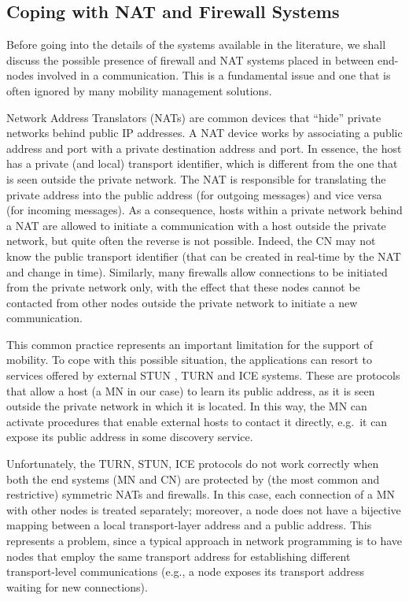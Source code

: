 \documentclass[preprint,12pt]{elsarticle}
\begin{document}
\subsection{Coping with NAT and Firewall Systems}

Before going into the details of the systems available in the literature, we shall discuss the possible presence of firewall and NAT systems placed in between end-nodes involved in a communication. 
This is a fundamental issue and one that is often ignored by many mobility management solutions.

Network Address Translators (NATs) are common devices that ``hide'' private 
networks behind public IP addresses.
A NAT device works by associating a public address and port with a private 
destination address and port. In essence, the host has a private (and local) 
transport identifier, which is different from the one that is seen outside the private 
network. The NAT is responsible for translating the private 
address into the public address (for outgoing messages) and vice versa (for 
incoming messages). As a consequence, hosts within a private network behind a 
NAT are allowed to initiate a communication with a host outside the private 
network, but quite often the reverse is not possible. Indeed, the CN may not 
know the public transport identifier (that can be created in real-time by 
the NAT and change in time).
Similarly, many firewalls allow connections to be initiated from the private 
network only, with the effect that these nodes cannot be contacted from other nodes outside the private network
to initiate a new communication. 

This common practice represents an important limitation for the support of 
mobility.
To cope with this possible situation, the applications can resort to services offered 
by external \ac{STUN} \cite{STUN}, \ac{TURN} \cite{TURN} and \ac{ICE} \cite{ice} systems. These 
are protocols that allow a host (a MN in our case) to learn its public address, 
as it is seen outside the private network in which it is located.
In this way, the MN can activate procedures that enable external hosts to contact 
it directly, e.g.~it can expose its public address in some discovery service.  

Unfortunately, the TURN, STUN, ICE protocols do not work correctly when both the 
end systems (MN and CN) are protected by (the most common and restrictive) 
symmetric NATs and firewalls. 
In this case, each connection of a MN with other nodes is treated separately; 
moreover, a node does not have a bijective mapping between a local 
transport-layer address and a public address.
This represents a problem, since a typical approach in network programming is to 
have nodes that 
employ the same  transport address for 
establishing different transport-level communications (e.g., a node exposes its 
transport address  waiting for new 
connections).
\end{document}
